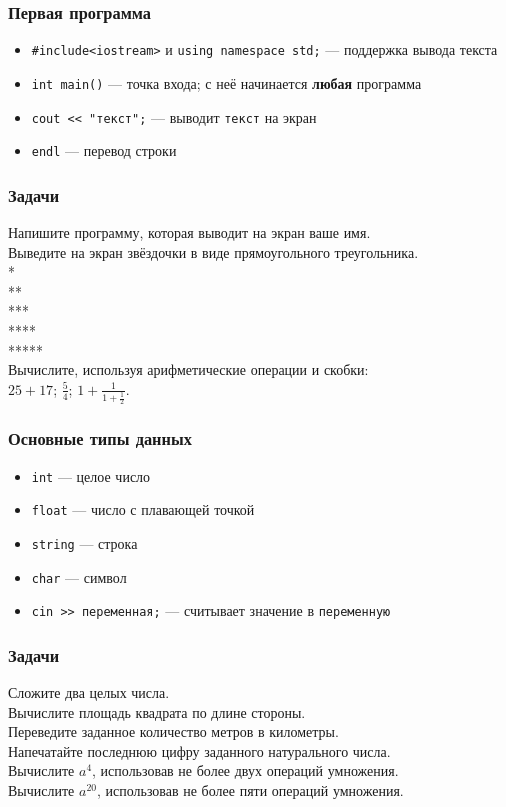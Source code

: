\documentclass[PDF,10pt,usenames,dvipsnames]{beamer}
\newcommand{\bigqm}[1][1]{\text{\larger[#1]{\textbf{?}}}}
\newcommand{\cpp}[1]{\textcolor{blue!40!black}{\tt #1}} %
\newcommand{\prblm}[1]{{\rm\bigqm[1]} {#1 \\} \vspace{10pt}} %
\begin{document}
\begin{frame}[t] 
	\frametitle{Первая программа} 
	\begin{itemize}
		\item	\cpp{\#include<iostream>} и \cpp{using namespace std;} --- поддержка вывода текста 
		\item	\cpp{int main()} --- точка входа; с неё начинается {\bf любая} программа 
		\item	\cpp{cout << "текст";} --- выводит \cpp{текст} на экран 
		\item	\cpp{endl} --- перевод строки 
	\end{itemize}
\end{frame}

\begin{frame}[t]
	\frametitle{Задачи} 
	\prblm{Напишите программу, которая выводит на экран ваше имя.} 
	\prblm{Выведите на экран звёздочки в виде прямоугольного треугольника. \\ *\\ ** \\ *** \\ **** \\ *****} 
	\prblm{Вычислите, используя арифметические операции и скобки: \\ \vspace{5pt} $25+17$; \hspace{12pt} $\frac{5}{4}$; \hspace{12pt} $1+\frac{1}{1+\frac{1}{2}}$.} 
\end{frame}

\begin{frame}[t]
	\frametitle{Основные типы данных} 
	\begin{itemize}
		\item \cpp{int} --- целое число 
		\item \cpp{float} --- число с плавающей точкой 
		\item \cpp{string} --- строка 
		\item \cpp{char} --- символ 
		\item	\cpp{cin >> переменная;} --- считывает значение в \cpp{переменную}
	\end{itemize}
\end{frame}

\begin{frame}[t]
	\frametitle{Задачи} 
	\prblm{Сложите два целых числа.} 
	\prblm{Вычислите площадь квадрата по длине стороны.} 
	\prblm{Переведите заданное количество метров в километры.} 
	\prblm{Напечатайте последнюю цифру заданного натурального числа.} 
	\prblm{Вычислите $a^4$, использовав не более двух операций умножения.} 
	\prblm{Вычислите $a^{20}$, использовав не более пяти операций умножения.} 
\end{frame}
\end{document}
